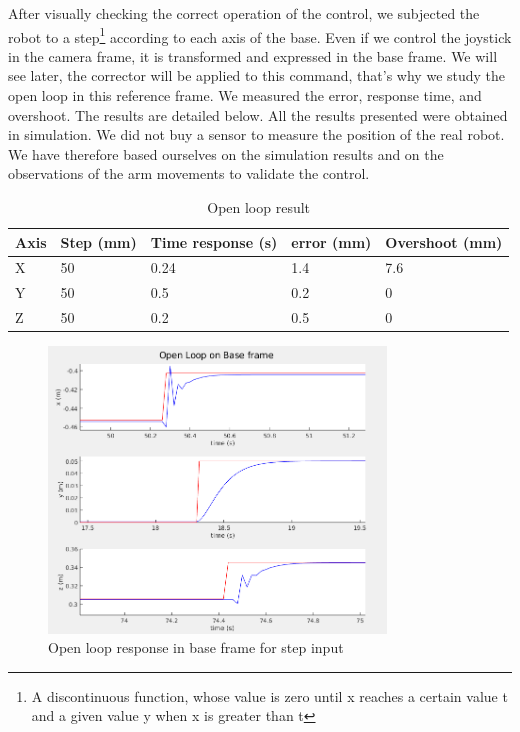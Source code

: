 \bigbreak 
After visually checking the correct operation of the control, we subjected the robot to a \gls{step}\footnote{A discontinuous function, whose value is zero until x reaches a certain value t and a given value y when x is greater than t} according to each axis of the base. Even if we control the joystick in the camera frame, it is transformed and expressed in the base frame. We will see later, the corrector will be applied to this command, that's why we study the open loop in this reference frame. We measured the error, response time, and overshoot. The results are detailed below. All the results presented were obtained in simulation. We did not buy a sensor to measure the position of the real robot. We have therefore based ourselves on the simulation results and on the observations of the arm movements to validate the control.

\begin{table}[ht]
    \centering
    \begin{tabular}{|p{1cm} | p{2.3cm} | p{3.5cm} | p{2.3cm}| p{3.3cm} |} 
        \hline
        \textbf{Axis} & \textbf{Step (mm)} &\textbf{Time response (s)} & \textbf{error (mm)} & \textbf{Overshoot (mm)}\\ [0.3ex]
        \hline
        X & 50 & 0.24 & 1.4 & 7.6 \\ 
        \hline
        Y & 50 & 0.5 & 0.2 & 0 \\ 
        \hline
        Z & 50 & 0.2 & 0.5 & 0 \\ 
        \hline
    \end{tabular}
    \caption{Open loop result}
\end{table}
\FloatBarrier

\begin{figure}[H]
    \centering
    \includegraphics[width=0.8\textwidth]{Images/Section07/openloopBaseFrame.png}
    \caption{Open loop response in base frame for step input}
    \label{fig:OpenLoopGraph}
\end{figure}


